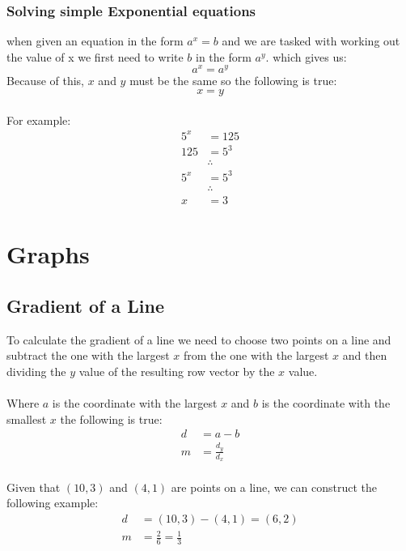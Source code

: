 \documentclass[a4paper]{article}
\begin{document}
\subsubsection{Solving simple Exponential equations}
when given an equation in the form $a^x = b$ and we
are tasked with working out the value of x we first
need to write $b$ in the form $a^y$. which gives us:
\begin{equation}
	a^x = a^y
\end{equation}
Because of this, $x$ and $y$ must be the same so the
following is true:
\begin{equation}
	x = y
\end{equation}
\\
For example:
\begin{align*}
	5^x &= 125\\
	125 &= 5^3\\
	&\therefore\\
	5^x &= 5^3\\
	&\therefore\\
	x &= 3
\end{align*}

\section{Graphs}

\subsection{Gradient of a Line}
To calculate the gradient of a line we need to choose two points on
a line and subtract the one with the largest $x$ from the one with the largest $x$
and then dividing the $y$ value of the resulting row vector by the $x$ value.
\\\\
Where $a$ is the coordinate with the largest $x$ and $b$ is the coordinate with the smallest $x$ the following is true:
\begin{align*}
	d &= a - b\\
	m &= \frac{d_y}{d_x}
\end{align*}
\\
Given that $(10, 3)$ and $(4, 1)$ are points on a line, we can construct the following example:
\begin{align*}
	d &= (10, 3) - (4, 1) = (6, 2)\\
	m &= \frac{2}{6} = \frac{1}{3}
\end{align*}
\end{document}
